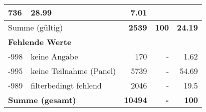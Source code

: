 \begin{longtable}{lXrrr}
       \num{736} &
       \num[round-mode=places,round-precision=2]{28.99} &
         \num[round-mode=places,round-precision=2]{7.01} \\
     \midrule
     \multicolumn{2}{l}{Summe (gültig)} &
       \textbf{\num{2539}} &
     \textbf{\num{100}} &
       \textbf{\num[round-mode=places,round-precision=2]{24.19}} \\
     \multicolumn{5}{l}{\textbf{Fehlende Werte}}\\
       -998 &
       keine Angabe &
         \num{170} &
        - &
         \num[round-mode=places,round-precision=2]{1.62} \\
       -995 &
       keine Teilnahme (Panel) &
         \num{5739} &
        - &
         \num[round-mode=places,round-precision=2]{54.69} \\
       -989 &
       filterbedingt fehlend &
         \num{2046} &
        - &
         \num[round-mode=places,round-precision=2]{19.5} \\
     \midrule
     \multicolumn{2}{l}{\textbf{Summe (gesamt)}} &
          \textbf{\num{10494}} &
        \textbf{-} &
        \textbf{\num{100}} \\
     \bottomrule
     \end{longtable}
     
